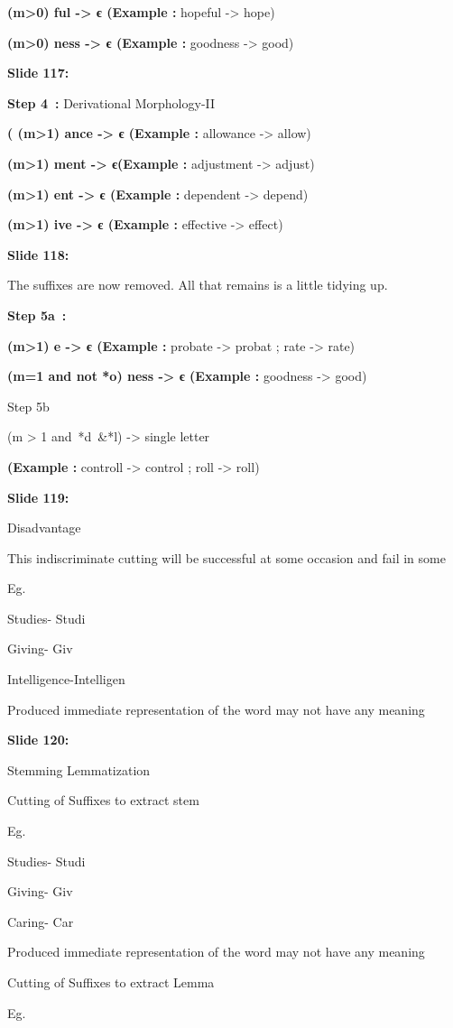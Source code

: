 \documentclass[11pt,a4paper]{article}
\begin{document}
\textbf{(m>0) ful -> є (Example :}  hopeful -> hope)

\textbf{(m>0) ness -> є (Example :}  goodness -> good)

\textbf{Slide 117:}

\textbf{Step 4 :} Derivational Morphology-II

\textbf{( (m>1) ance -> є (Example :}  allowance -> allow)

\textbf{(m>1) ment -> є(Example :}  adjustment -> adjust)

\textbf{(m>1) ent -> є (Example :}  dependent -> depend)

\textbf{(m>1) ive -> є (Example :}  effective -> effect)

\textbf{Slide 118:}

The suffixes are now removed. All that remains is a little tidying up.

\textbf{Step 5a :} 

\textbf{(m>1) e -> є (Example :}  probate -> probat ; rate -> rate)

\textbf{(m=1 and not *o) ness -> є (Example :}  goodness -> good)

Step 5b

(m > 1 and *d &*l) -> single letter

\textbf{(Example :}  controll -> control ; roll -> roll)

\textbf{Slide 119:}

Disadvantage

This indiscriminate cutting will be successful at some occasion and fail in some

Eg.

Studies- 	 Studi

Giving-   	 Giv

Intelligence-Intelligen

Produced immediate representation of the word  may not have any meaning

\textbf{Slide 120:}

Stemming					Lemmatization

Cutting of Suffixes to extract stem

Eg.

Studies- 	 Studi

Giving-   	 Giv

Caring-         Car

Produced immediate representation of the word  may not have any meaning

Cutting of Suffixes to extract Lemma

Eg.
\end{document}
